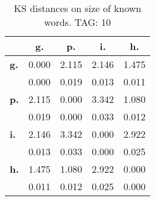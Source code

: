 \begin{table}[h!]
\begin{center}
\begin{tabular}{| l || c | c | c | c |}\hline
 & {\bf g.} & {\bf p.} & {\bf i.} & {\bf h.} \\\hline\hline
{\bf g.} & 0.000 & 2.115 & 2.146 & 1.475 \\
{\bf } & 0.000 & 0.019 & 0.013 & 0.011 \\\hline
{\bf p.} & 2.115 & 0.000 & 3.342 & 1.080 \\
{\bf } & 0.019 & 0.000 & 0.033 & 0.012 \\\hline
{\bf i.} & 2.146 & 3.342 & 0.000 & 2.922 \\
{\bf } & 0.013 & 0.033 & 0.000 & 0.025 \\\hline
{\bf h.} & 1.475 & 1.080 & 2.922 & 0.000 \\
{\bf } & 0.011 & 0.012 & 0.025 & 0.000 \\\hline
\end{tabular}
\caption{KS distances on size of known words. TAG: 10}
\end{center}
\end{table}